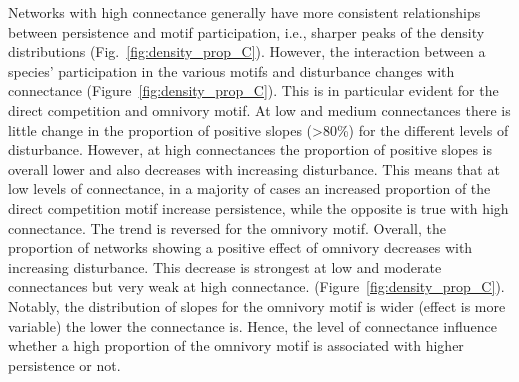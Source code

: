 \documentclass[12pt]{article}
\begin{document}
\begin{spacing}{2.0}
            Networks with high connectance generally have more consistent relationships between persistence and motif participation, i.e., sharper peaks of the density distributions (Fig.~\ref{fig:density_prop_C}). However, the interaction between a species' participation in the various motifs and disturbance changes with connectance  (Figure~\ref{fig:density_prop_C}).
            This is in particular evident for the direct competition and omnivory motif. At low and medium connectances there is little change in the proportion of positive slopes (\textgreater80\%) for the different levels of disturbance. However, at high connectances the proportion of positive slopes is overall lower and also decreases with increasing disturbance. This means that at low levels of connectance, in a majority of cases an increased proportion of the direct competition motif increase persistence, while the opposite is true with high connectance. 
            The trend is reversed for the omnivory motif.
            Overall, the proportion of networks showing a positive effect of omnivory decreases with increasing disturbance.
            This decrease is strongest at low and moderate connectances but very weak at high connectance. (Figure~\ref{fig:density_prop_C}). Notably, the distribution of slopes for the omnivory motif is wider (effect is more variable) the lower the connectance is.
            Hence, the level of connectance influence whether a high proportion of the omnivory motif is associated with higher persistence or not.



\end{spacing}
\end{document}
